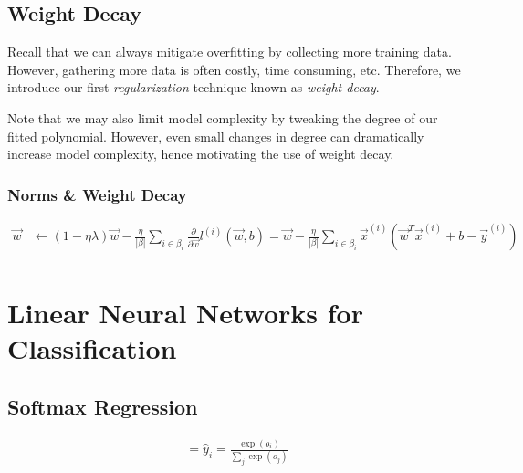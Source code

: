 \documentclass[a4paper,12pt]{article}
\theoremstyle{definition}
\begin{document}
    \subsection*{Weight Decay}
    Recall that we can always mitigate overfitting by collecting more training data. However, gathering more data is often costly, time consuming,
    etc. Therefore, we introduce our first \textit{regularization} technique known as \textit{weight decay}.
    
    Note that we may also limit model complexity by tweaking the degree of our fitted polynomial. However, even small
    changes in degree can dramatically increase model complexity, hence motivating the use of weight decay.

    \subsubsection*{Norms \& Weight Decay}
    \begin{equation*}
        \begin{aligned}
            \vec{w}     &\leftarrow (1-\eta\lambda)\vec{w} - \frac{\eta}{|\beta|}\sum_{i\in\beta_i}\frac{\partial}{\partial\vec{w}}l^{(i)}(\vec{w},b) = \vec{w}- \frac{\eta}{|\beta|}\sum_{i\in\beta_i}\vec{x}^{(i)}(\vec{w}^T\vec{x}^{(i)} + b - \vec{y}^{(i)}) \\
        \end{aligned}
    \end{equation*}

\section*{Linear Neural Networks for Classification}
    \subsection*{Softmax Regression}


    \begin{equation*}
        \begin{aligned}
             = \hat{y}_i = \frac{\exp(o_i)}{\sum_{j}\exp(o_j)}
        \end{aligned}
    \end{equation*}
    
\end{document}
